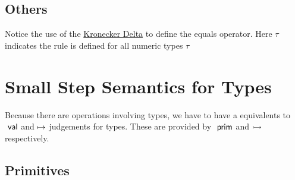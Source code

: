 \documentclass{article}
\begin{document}
\subsection{Others}
Notice the use of the \href{https://en.wikipedia.org/wiki/Kronecker_delta}{Kronecker Delta} to define the equals operator. Here $\tau$ indicates the rule is defined for all numeric types $\tau$
{
    \centering
    \def \MathparLineskip {\lineskip=0.43cm}
}

\section{Small Step Semantics for Types}
Because there are operations involving types, we have to have a equivalents to $~\mathsf{val}$ and $\mapsto$ judgements for types. These are provided by $~\mathsf{prim}$ and $\rightarrowtail$ respectively.

\subsection{Primitives}
{
    \centering
    \def \MathparLineskip {\lineskip=0.43cm}
}
\end{document}
